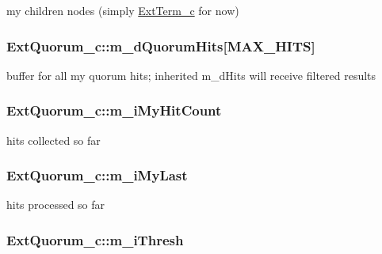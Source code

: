 my children nodes (simply \hyperlink{classExtTerm__c}{Ext\-Term\-\_\-c} for now) 

\hypertarget{classExtQuorum__c_ac516e17dd9536d086bf35aaf5b25a273}{
\subsubsection[{m\-\_\-d\-Quorum\-Hits}]{ Ext\-Quorum\-\_\-c\-::m\-\_\-d\-Quorum\-Hits\mbox{[}{\bf M\-A\-X\-\_\-\-H\-I\-T\-S}\mbox{]}\hspace{0.3cm}{\ttfamily [private]}}}\label{classExtQuorum__c_ac516e17dd9536d086bf35aaf5b25a273}


buffer for all my quorum hits; inherited m\-\_\-d\-Hits will receive filtered results 

\hypertarget{classExtQuorum__c_a0fcb4df0253039b183597e3c7aa9e50e}{
\subsubsection[{m\-\_\-i\-My\-Hit\-Count}]{ Ext\-Quorum\-\_\-c\-::m\-\_\-i\-My\-Hit\-Count\hspace{0.3cm}{\ttfamily [private]}}}\label{classExtQuorum__c_a0fcb4df0253039b183597e3c7aa9e50e}


hits collected so far 

\hypertarget{classExtQuorum__c_a29760dc18c41ce8fa14e924145d894cb}{
\subsubsection[{m\-\_\-i\-My\-Last}]{ Ext\-Quorum\-\_\-c\-::m\-\_\-i\-My\-Last\hspace{0.3cm}{\ttfamily [private]}}}\label{classExtQuorum__c_a29760dc18c41ce8fa14e924145d894cb}


hits processed so far 

\hypertarget{classExtQuorum__c_a987d1c1f27fd6cbc16b8d143153cdbad}{
\subsubsection[{m\-\_\-i\-Thresh}]{ Ext\-Quorum\-\_\-c\-::m\-\_\-i\-Thresh\hspace{0.3cm}{\ttfamily [private]}}}\label{classExtQuorum__c_a987d1c1f27fd6cbc16b8d143153cdbad}


